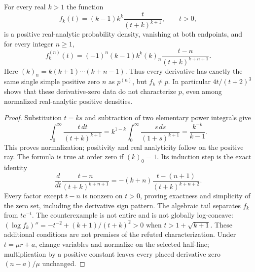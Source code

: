 \begin{theorem}
\label{final:Z4}
For every real $k>1$ the function
\[
 f_k(t)=(k-1)k^k\frac{t}{(t+k)^{k+1}},\qquad t>0,
\]
is a positive real-analytic probability density, vanishing at both
endpoints, and for every integer $n\ge1$,
\[
 f_k^{(n)}(t)=(-1)^n(k-1)k^k(k)_n
          \frac{t-n}{(t+k)^{k+n+1}}.
\]
Here $(k)_n=k(k+1)\cdots(k+n-1)$. Thus every derivative has
exactly the same single simple positive zero $n$ as $p^{(n)}$,
but $f_k\ne p$. In particular $4t/(t+2)^3$ shows that these
derivative-zero data do not characterize $p$, even among normalized
real-analytic positive densities.
\end{theorem}
\begin{proof}
Substitution $t=ks$ and subtraction of two elementary power integrals
give
\[
 \int_0^\infty \frac{t\,dt}{(t+k)^{k+1}}
 =k^{1-k}\int_0^\infty\frac{s\,ds}{(1+s)^{k+1}}
 =\frac{k^{-k}}{k-1}.
\]
This proves normalization; positivity and real analyticity follow
on the positive ray. The formula is true at order zero if $(k)_0=1$.
Its induction step is the exact identity
\[
 \frac{d}{dt}\frac{t-n}{(t+k)^{k+n+1}}
 =-(k+n)\frac{t-(n+1)}{(t+k)^{k+n+2}}.
\]
Every factor except $t-n$ is nonzero on $t>0$, proving exactness
and simplicity of the zero set, including the derivative sign pattern.
The algebraic tail separates $f_k$ from $te^{-t}$.
The counterexample is not entire and is not globally log-concave:
$(\log f_k)''=-t^{-2}+(k+1)/(t+k)^2>0$ when
$t>1+\sqrt{k+1}$. These additional conditions are not premises of
the refuted characterization. Under $t=\mu r+a$, change variables
and normalize on the selected half-line; multiplication by a positive
constant leaves every placed derivative zero $(n-a)/\mu$ unchanged.
\end{proof}
